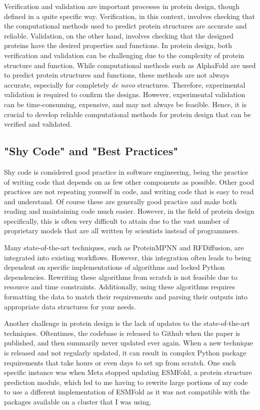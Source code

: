 \documentclass[a4paper, 11pt]{article} %
\begin{document}
Verification and validation are important processes in protein design, though defined in a quite specific way. Verification, in this context, involves checking that the computational methods used to predict protein structures are accurate and reliable. Validation, on the other hand, involves checking that the designed proteins have the desired properties and functions. In protein design, both verification and validation can be challenging due to the complexity of protein structure and function. While computational methods such as AlphaFold are used to predict protein structures and functions, these methods are not always accurate, especially for completely \textit{de novo} structures. Therefore, experimental validation is required to confirm the designs. However, experimental validation can be time-consuming, expensive, and may not always be feasible. Hence, it is crucial to develop reliable computational methods for protein design that can be verified and validated.

\subsection*{"Shy Code" and "Best Practices"}

Shy code is considered good practice in software engineering, being the practice of writing code that depends on as few other components as possible. Other good practices are not repeating yourself in code, and writing code that is easy to read and understand. Of course these are generally good practice and make both reading and maintaining code much easier. However, in the field of protein design specifically, this is often very difficult to attain due to the vast number of proprietary models that are all written by scientists instead of programmers.

Many state-of-the-art techniques, such as ProteinMPNN and RFDiffusion, are integrated into existing workflows\cite*{dauparasRobustDeepLearning2022,watsonBroadlyApplicableAccurate2022}. However, this integration often leads to being dependent on specific implementations of algorithms and locked Python dependencies. Rewriting these algorithms from scratch is not feasible due to resource and time constraints. Additionally, using these algorithms requires formatting the data to match their requirements and parsing their outputs into appropriate data structures for your needs.

Another challenge in protein design is the lack of updates to the state-of-the-art techniques. Oftentimes, the codebase is released to Github when the paper is published, and then summarily never updated ever again. When a new technique is released and not regularly updated, it can result in complex Python package requirements that take hours or even days to set up from scratch. One such specific instance was when Meta stopped updating ESMFold\cite*{linEvolutionaryscalePredictionAtomiclevel2023a}, a protein structure prediction module, which led to me having to rewrite large portions of my code to use a different implementation of ESMFold as it was not compatible with the packages available on a cluster that I was using.
\end{document}
